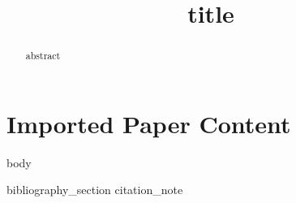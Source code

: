 \documentclass[10pt,twocolumn]{article}
\title{{{title}}}
\begin{document}
\maketitle

\begin{abstract}
{{abstract}}
\end{abstract}

\section*{Imported Paper Content}
{{body}}

{{bibliography_section}}
{{citation_note}}
\end{document}
